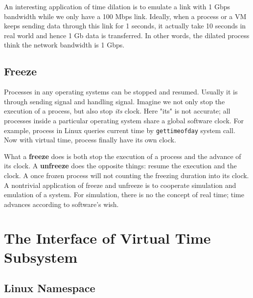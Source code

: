 \documentclass{acm_proc_article-sp}
\begin{document}
An interesting application of time dilation is to emulate a link with 1 Gbps bandwidth while we only have a 100 Mbps link. Ideally, when a process or a VM keeps sending data through this link for 1 seconds, it actually take 10 seconds in real world and hence 1 Gb data is transferred. In other words, the dilated process think the network bandwidth is 1 Gbps.

\subsection{Freeze}
Processes in any operating systems can be stopped and resumed. Usually it is through sending signal and handling signal. Imagine we not only stop the execution of a process, but also stop \textit{its} clock. Here "its" is not accurate; all processes inside a particular operating system share a global software clock. For example, process in Linux queries current time by \texttt{gettimeofday} system call. Now with virtual time, process finally have its own clock.

What a \textbf{freeze} does is both stop the execution of a process and the advance of its clock. A \textbf{unfreeze} does the opposite things: resume the execution and the clock. A once frozen process will not counting the freezing duration into its clock. A nontrivial application of freeze and unfreeze is to cooperate simulation and emulation of a system. For simulation, there is no the concept of real time; time advances according to software's wish. 

\section{The Interface of Virtual Time Subsystem}
\subsection{Linux Namespace}
\end{document}

